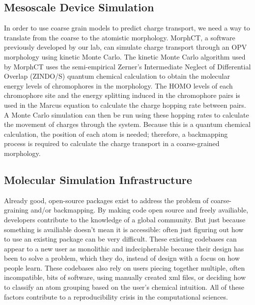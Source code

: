
\subsection*{Mesoscale Device Simulation}

In order to use coarse grain models to predict charge transport, we need a way to translate from the coarse to the atomistic morphology.
MorphCT, a software previously developed by our lab, can simulate charge transport through an OPV morphology using kinetic Monte Carlo\cite{Miller2018a,MorphCT,morphct2.2}.
The kinetic Monte Carlo algorithm used by MorphCT uses the semi-empirical Zerner's Intermediate Neglect of Differential Overlap (ZINDO/S) quantum chemical calculation to obtain the molecular energy levels of chromophores in the morphology.
The HOMO levels of each chromophore site and the energy splitting induced in the chromophore pairs is used in the Marcus equation to calculate the charge hopping rate between pairs.
A Monte Carlo simulation can then be run using these hopping rates to calculate the movement of charges through the system.
Because this is a quantum chemical calculation, the position of each atom is needed; therefore, a backmapping process is required to calculate the charge transport in a coarse-grained morphology.

\subsection*{Molecular Simulation Infrastructure}

Already good, open-source packages exist to address the problem of coarse-graining and/or backmapping\cite{Marrink2007,Ruhle2009,Maerzke2011,MorphCT,Wassenaar2014b}. %
By making code open source and freely availiable, developers contribute to the knowledge of a global community. 
But just because something is availiable doesn't mean it is accessible: often just figuring out how to use an existing package can be very difficult\cite{Cummings2019}.
These existing codebases can appear to a new user as monolithic and indecipherable because their design has been to solve a problem, which they do, instead of design with a focus on how people learn.
These codebases also rely on users piecing together multiple, often incompatible, bits of software, using manually created xml files, or deciding how to classify an atom grouping based on the user's chemical intuition.
All of these factors contribute to a reproducibility crisis in the computational sciences\cite{Baker2016}.

